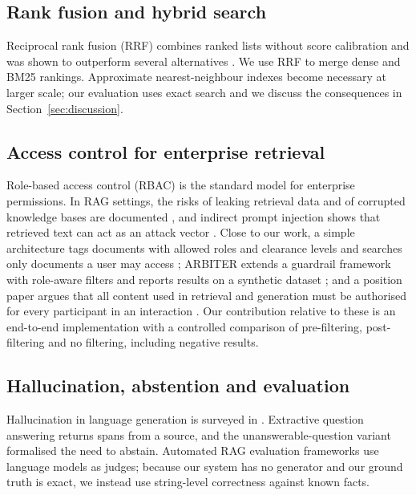 \documentclass[journal]{IEEEtran}
\begin{document}
\subsection{Rank fusion and hybrid search}
Reciprocal rank fusion (RRF) combines ranked lists without score calibration and was shown to outperform several alternatives \cite{cormack2009rrf}. We use RRF to merge dense and BM25 rankings. Approximate nearest-neighbour indexes \cite{malkov2018hnsw,johnson2019faiss} become necessary at larger scale; our evaluation uses exact search and we discuss the consequences in Section~\ref{sec:discussion}.

\subsection{Access control for enterprise retrieval}
Role-based access control (RBAC) \cite{sandhu1996rbac,ferraiolo2001nist} is the standard model for enterprise permissions. In RAG settings, the risks of leaking retrieval data and of corrupted knowledge bases are documented \cite{zeng2024privacy,zou2024poisonedrag}, and indirect prompt injection shows that retrieved text can act as an attack vector \cite{greshake2023indirect}. Close to our work, a simple architecture tags documents with allowed roles and clearance levels and searches only documents a user may access \cite{simplearch2024}; ARBITER extends a guardrail framework with role-aware filters and reports results on a synthetic dataset \cite{arbiter2025}; and a position paper argues that all content used in retrieval and generation must be authorised for every participant in an interaction \cite{position2025participant}. Our contribution relative to these is an end-to-end implementation with a controlled comparison of pre-filtering, post-filtering and no filtering, including negative results.

\subsection{Hallucination, abstention and evaluation}
Hallucination in language generation is surveyed in \cite{ji2023hallucination,huang2023hallucination}. Extractive question answering \cite{rajpurkar2016squad} returns spans from a source, and the unanswerable-question variant \cite{rajpurkar2018squad2} formalised the need to abstain. Automated RAG evaluation frameworks \cite{es2023ragas,saadfalcon2023ares} use language models as judges; because our system has no generator and our ground truth is exact, we instead use string-level correctness against known facts.
\end{document}
